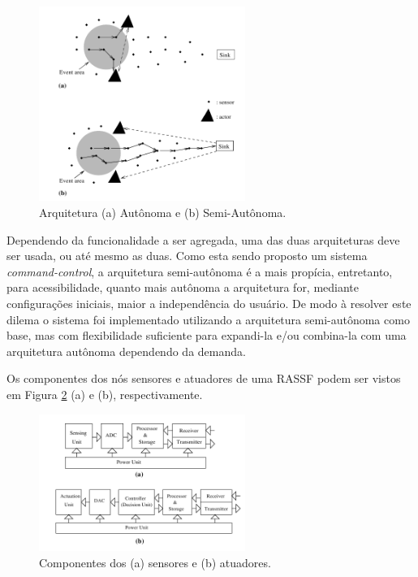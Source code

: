 \documentclass[12pt,a4paper,oneside]{report}
\begin{document}
\begin{figure}[htbp]
   \centering
    \includegraphics[width=0.6\textwidth]{figuras/figura_2_6}
    \caption{Arquitetura (a) Autônoma e (b) Semi-Autônoma.}
    \label{fig:arquitetura-autonoma}
\end{figure}

Dependendo da funcionalidade a ser agregada, uma das duas arquiteturas deve ser usada, ou até mesmo as duas. Como esta sendo proposto um sistema \emph{command-control}, a arquitetura semi-autônoma é a mais propícia, entretanto, para acessibilidade, quanto mais autônoma a arquitetura for, mediante configurações iniciais, maior a independência do usuário. De modo à resolver este dilema o sistema foi implementado utilizando a arquitetura semi-autônoma como base, mas com flexibilidade suficiente para expandi-la e/ou combina-la com uma arquitetura autônoma dependendo da demanda.

Os componentes dos nós sensores e atuadores de uma RASSF podem ser vistos em Figura \ref{fig:componentes-atuador-sensor} (a) e (b), respectivamente.

\begin{figure}[htbp]
   \centering
    \includegraphics[width=0.6\textwidth]{figuras/figura_2_7}
    \caption{Componentes dos (a) sensores e (b) atuadores.}
    \label{fig:componentes-atuador-sensor}
\end{figure}
\end{document}
